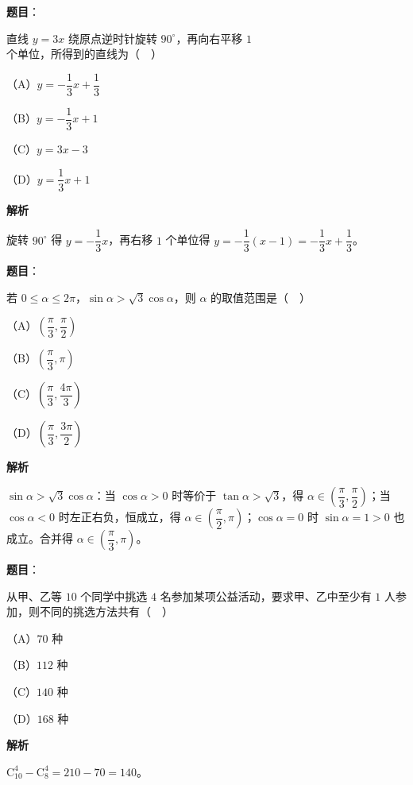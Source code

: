 \begin{answer}

\textbf{题目}：

直线 $y=3x$ 绕原点逆时针旋转 $90^\circ$，再向右平移 $1$ 个单位，所得到的直线为（　）

（A）$y=-\dfrac13x+\dfrac13$

（B）$y=-\dfrac13x+1$

（C）$y=3x-3$

（D）$y=\dfrac13x+1$

\textbf{解析}

旋转 $90^\circ$ 得 $y=-\dfrac13x$，再右移 $1$ 个单位得 $y=-\dfrac13(x-1)=-\dfrac13x+\dfrac13$。


\end{answer}
\begin{answer}

\textbf{题目}：

若 $0\leqslant\alpha\leqslant2\pi$，$\sin\alpha>\sqrt3\cos\alpha$，则 $\alpha$ 的取值范围是（　）

（A）$\left(\dfrac{\pi}3,\dfrac{\pi}2\right)$

（B）$\left(\dfrac{\pi}3,\pi\right)$

（C）$\left(\dfrac{\pi}3,\dfrac{4\pi}3\right)$

（D）$\left(\dfrac{\pi}3,\dfrac{3\pi}2\right)$

\textbf{解析}

$\sin\alpha>\sqrt3\cos\alpha$：当 $\cos\alpha>0$ 时等价于 $\tan\alpha>\sqrt3$，得 $\alpha\in\left(\dfrac{\pi}3,\dfrac{\pi}2\right)$；当 $\cos\alpha<0$ 时左正右负，恒成立，得 $\alpha\in\left(\dfrac{\pi}2,\pi\right)$；$\cos\alpha=0$ 时 $\sin\alpha=1>0$ 也成立。合并得 $\alpha\in\left(\dfrac{\pi}3,\pi\right)$。


\end{answer}
\begin{answer}

\textbf{题目}：

从甲、乙等 $10$ 个同学中挑选 $4$ 名参加某项公益活动，要求甲、乙中至少有 $1$ 人参加，则不同的挑选方法共有（　）

（A）$70$ 种

（B）$112$ 种

（C）$140$ 种

（D）$168$ 种

\textbf{解析}

$\mathrm C_{10}^4-\mathrm C_8^4=210-70=140$。


\end{answer}
